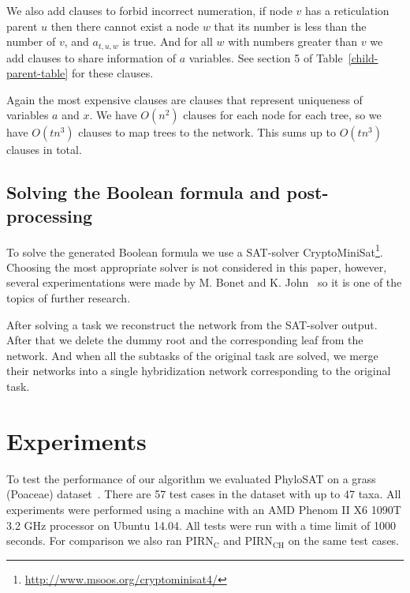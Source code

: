\documentclass[runningheads, envcountsame, a4paper]{llncs}
\begin{document}
We also add clauses to forbid incorrect numeration, if node $v$ has a reticulation parent $u$ then there cannot 
exist a node $w$ that its number is less than the number of $v$, and $a_{t,u,w}$ is true. And for all $w$ with numbers 
greater than $v$ we add clauses to share information of $a$ variables. See section 5 of Table~\ref{child-parent-table} for these clauses.

Again the most expensive clauses are clauses that represent uniqueness of variables $a$ and $x$. We have $O(n^2)$ clauses for
each node for each tree, so we have $O(tn^3)$ clauses to map trees to the network. This sums up to $O(tn^3)$ clauses in total.

\subsection{Solving the Boolean formula and post-processing}

To solve the generated Boolean formula we use a SAT-solver CryptoMiniSat\footnote{\url{http://www.msoos.org/cryptominisat4/}}.
Choosing the most appropriate solver is not considered in this paper, however, several experimentations were made by 
M. Bonet and K. John~\cite{bonet2009efficiently} so it is one of the topics of further research.

After solving a task we reconstruct the network from the SAT-solver output. After that we delete the dummy root and the corresponding 
leaf from the network. And when all the subtasks of the original task are solved, we merge their networks into a single 
hybridization network corresponding to the original task.

\section{Experiments}

To test the performance of our algorithm we evaluated PhyloSAT on a grass (Poaceae) dataset~\cite{grass2001phylogeny}. There are 57 test cases in the dataset with up to 47 taxa. All experiments were performed using a machine with an AMD Phenom II X6 1090T 3.2 GHz 
processor on Ubuntu 14.04. All tests were run with a time limit of 1000 seconds. For comparison we also ran PIRN$\mathrm{_C}$ and PIRN$\mathrm{_{CH}}$ 
on the same test cases. 
\end{document}
